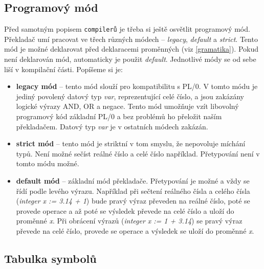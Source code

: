 \documentclass[
12pt,
a4paper,
pdftex,
czech,
titlepage
]{report}
\begin{document}
\subsection{Programový mód}   \label{programMode}
  Před samotným popisem \texttt{compilerů} je třeba si ještě osvětlit programový mód. Překladač umí pracovat ve třech různých módech -- \textit{legacy}, \textit{default} a \textit{strict}. Tento mód je možné deklarovat před deklaracemi proměnných (viz \ref{gramatika}). Pokud není deklarován mód, automaticky je použit \textit{default}.
  Jednotlivé módy se od sebe liší v kompilační části. Popíšeme si je:
\begin{itemize}
\item \textbf{legacy mód} -- tento mód slouží pro kompatibilitu s PL/0. V tomto módu je jediný povolený datový typ \textit{var}, reprezentující celé číslo,  a jsou zakázány logické výrazy AND, OR a negace. Tento mód umožňuje vzít libovolný programový kód základní PL/0 a bez problémů ho přeložit naším překladačem. Datový typ \textit{var} je v ostatních módech zakázán.
\item \textbf{strict mód} -- tento mód je striktní v tom smyslu, že nepovoluje míchání typů. Není možné sečíst reálné číslo a celé číslo například. Přetypování není v tomto módu možné.
\item \textbf{default mód} -- základní mód překladače. Přetypování je možné a vždy se řídí podle levého výrazu. Například při sečtení reálného čísla a celého čísla (\textit{integer x := 3.14 + 1}) bude pravý výraz převeden na reálné číslo, poté se provede operace a až poté se výsledek převede na celé číslo a uloží do proměnné \textit{x}. Při obrácení výrazů (\textit{integer x := 1 + 3.14}) se pravý výraz převede na celé číslo, provede se operace a výsledek se uloží do proměnné \textit{x}. 
\end{itemize}
  
\subsection{Tabulka symbolů}
  
\end{document}
